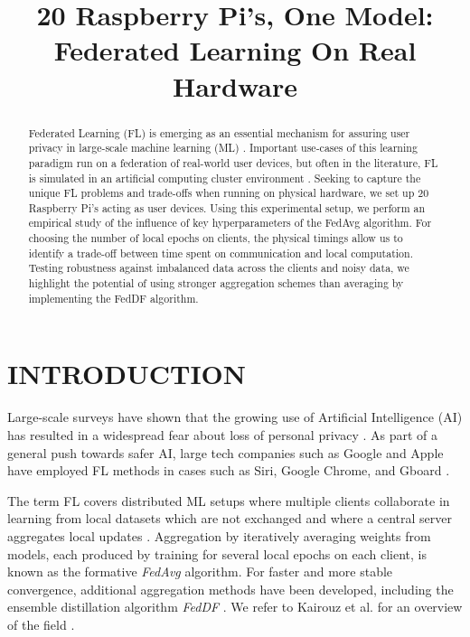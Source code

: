 \documentclass{article}
\title{20 Raspberry Pi's, One Model: Federated Learning On Real Hardware}
\begin{document}
%

\maketitle
%

\begin{abstract}
    Federated Learning (FL) is emerging as an essential mechanism for assuring user privacy in large-scale machine learning (ML) \cite{kai2021advances}.
    Important use-cases of this learning paradigm run on a federation of real-world user devices, but often in the literature, FL is simulated in an artificial computing cluster environment \cite{kai2021advances,mcmahan2017communication,lin2020ensemble}.
    Seeking to capture the unique FL problems and trade-offs when running on physical hardware, we set up 20 Raspberry Pi's acting as user devices.
    Using this experimental setup, we perform an empirical study of the influence of key hyperparameters of the FedAvg \cite{mcmahan2017communication} algorithm.
    For choosing the number of local epochs on clients, the physical timings allow us to identify a trade-off between time spent on communication and local computation.
    Testing robustness against imbalanced data across the clients and noisy data, we highlight the potential of using stronger aggregation schemes than averaging by implementing the FedDF \cite{lin2020ensemble} algorithm.
\end{abstract}

\section{INTRODUCTION}
\label{sec:intro}
Large-scale surveys have shown that the growing use of Artificial Intelligence (AI) has resulted in a widespread fear about loss of personal privacy \cite{beuc2020consumers, west2018survey}.
As part of a general push towards safer AI, large tech companies such as Google and Apple have employed FL methods in cases such as Siri, Google Chrome, and Gboard \cite{kai2021advances}.

The term FL covers distributed ML setups where multiple clients collaborate in learning from local datasets which are not exchanged and where a central server aggregates local updates \cite{kai2021advances, mcmahan2017communication}.
Aggregation by iteratively averaging weights from models, each produced by training for several local epochs on each client, is known as the formative \emph{FedAvg} \cite{mcmahan2017communication} algorithm.
For faster and more stable convergence, additional aggregation methods have been developed, including the ensemble distillation algorithm \emph{FedDF} \cite{lin2020ensemble}. 
We refer to Kairouz et al. for an overview of the field \cite{kai2021advances}.
\end{document}
